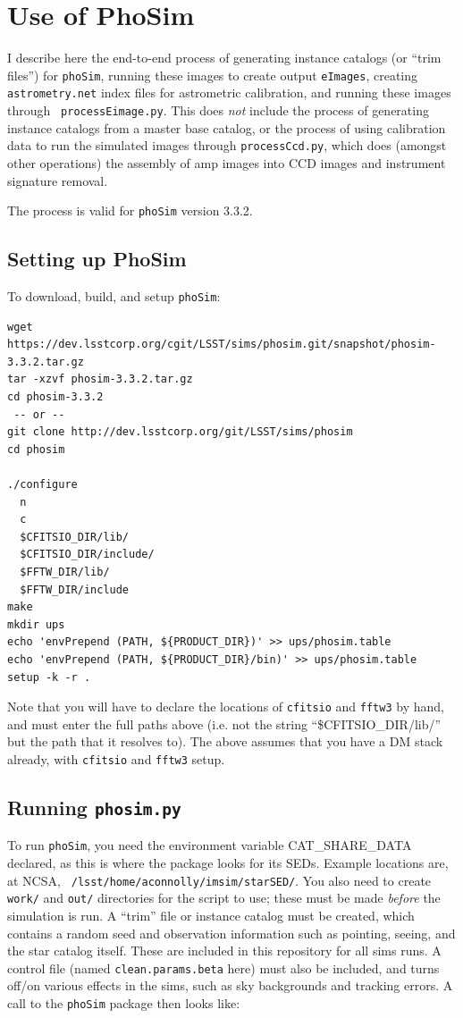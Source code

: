 \documentclass[DM,toc]{lsstdoc}
\begin{document}
\section{Use of PhoSim}

I describe here the end-to-end process of generating instance catalogs
(or ``trim files'') for {\tt phoSim}, running these images to create
output {\tt eImages}, creating {\tt astrometry.net} index files for
astrometric calibration, and running these images through {\tt
  processEimage.py}.  This does {\it not} include the process of
generating instance catalogs from a master base catalog, or the
process of using calibration data to run the simulated images through
{\tt processCcd.py}, which does (amongst other operations) the
assembly of amp images into CCD images and instrument signature
removal.

The process is valid for {\tt phoSim} version 3.3.2.

\subsection{Setting up PhoSim}

To download, build, and setup {\tt phoSim}:

{\small
\begin{Verbatim}[frame=single]
wget https://dev.lsstcorp.org/cgit/LSST/sims/phosim.git/snapshot/phosim-3.3.2.tar.gz
tar -xzvf phosim-3.3.2.tar.gz
cd phosim-3.3.2
 -- or --
git clone http://dev.lsstcorp.org/git/LSST/sims/phosim
cd phosim

./configure
  n
  c
  $CFITSIO_DIR/lib/
  $CFITSIO_DIR/include/
  $FFTW_DIR/lib/
  $FFTW_DIR/include
make
mkdir ups
echo 'envPrepend (PATH, ${PRODUCT_DIR})' >> ups/phosim.table
echo 'envPrepend (PATH, ${PRODUCT_DIR}/bin)' >> ups/phosim.table
setup -k -r .
\end{Verbatim}
}

Note that you will have to declare the locations of {\tt cfitsio} and
{\tt fftw3} by hand, and must enter the full paths above (i.e. not the
string ``\$CFITSIO\_DIR/lib/'' but the path that it resolves to).  The
above assumes that you have a DM stack already, with {\tt cfitsio} and
{\tt fftw3} setup.

\subsection{Running {\tt phosim.py}}

To run {\tt phoSim}, you need the environment variable
CAT\_SHARE\_DATA declared, as this is where the package looks for its
SEDs.  Example locations are, at NCSA, {\tt
  /lsst/home/aconnolly/imsim/starSED/}.  You also need to create {\tt
  work/} and {\tt out/} directories for the script to use; these must
be made {\it before} the simulation is run.  A ``trim'' file or
instance catalog must be created, which contains a random seed and
observation information such as pointing, seeing, and the star catalog
itself.  These are included in this repository for all sims runs.  A
control file (named {\tt clean.params.beta} here) must also be
included, and turns off/on various effects in the sims, such as sky
backgrounds and tracking errors.  A call to the {\tt phoSim} package
then looks like:
\end{document}
